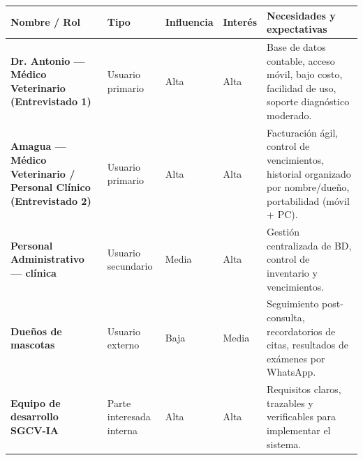 \documentclass[
]{article}
\newcounter{none} %
\begin{document}
{\def\LTcaptype{none} %
\begin{longtable}[]{@{}
  >{\raggedright\arraybackslash}p{}
  >{\raggedright\arraybackslash}p{}
  >{\centering\arraybackslash}p{}
  >{\centering\arraybackslash}p{}
  >{\raggedright\arraybackslash}p{}@{}}
\toprule\noalign{}
\begin{minipage}[b]{\linewidth}\raggedright
\textbf{Nombre / Rol}
\end{minipage} & \begin{minipage}[b]{\linewidth}\centering
\textbf{Tipo}
\end{minipage} & \begin{minipage}[b]{\linewidth}\centering
\textbf{Influencia}
\end{minipage} & \begin{minipage}[b]{\linewidth}\centering
\textbf{Interés}
\end{minipage} & \begin{minipage}[b]{\linewidth}\raggedright
\textbf{Necesidades y expectativas}
\end{minipage} \\
\midrule\noalign{}
\endhead
\bottomrule\noalign{}
\endlastfoot
\textbf{Dr. Antonio --- Médico Veterinario (Entrevistado 1)} &
\begin{minipage}[t]{\linewidth}\raggedright
Usuario primario
\end{minipage} & Alta & Alta & Base de datos contable, acceso móvil,
bajo costo, facilidad de uso, soporte diagnóstico moderado. \\
\textbf{Amagua --- Médico Veterinario / Personal Clínico (Entrevistado
2)} & \begin{minipage}[t]{\linewidth}\raggedright
Usuario primario
\end{minipage} & Alta & Alta & Facturación ágil, control de
vencimientos, historial organizado por nombre/dueño, portabilidad (móvil + PC). \\
\textbf{Personal Administrativo --- clínica} &
\begin{minipage}[t]{\linewidth}\raggedright
Usuario secundario
\end{minipage} & Media & Alta & Gestión centralizada de BD, control de
inventario y vencimientos. \\
\textbf{Dueños de mascotas} &
\begin{minipage}[t]{\linewidth}\raggedright
Usuario externo
\end{minipage} & Baja & Media & Seguimiento post-consulta, recordatorios
de citas, resultados de exámenes por WhatsApp. \\
\textbf{Equipo de desarrollo SGCV-IA} &
\begin{minipage}[t]{\linewidth}\raggedright
Parte interesada interna
\end{minipage} & Alta & Alta & Requisitos claros, trazables y
verificables para implementar el sistema. \\
\end{longtable}
}
\end{document}
